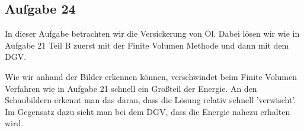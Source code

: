\newpage
\subsection{Aufgabe 24}
In dieser Aufgabe betrachten wir die Versickerung von Öl. Dabei lösen wir wie in Aufgabe 21 Teil B zuerst mit der Finite Volumen Methode und dann mit dem DGV.
\begin{figure}[H]
	\centering
\end{figure}
Wie wir anhand der Bilder erkennen können, verschwindet beim Finite Volumen Verfahren wie in Aufgabe 21 schnell ein Großteil der Energie. An den Schaubildern erkennt man das daran, dass die Lösung relativ schnell 'verwischt'. Im Gegensatz dazu sieht man bei dem DGV, dass die Energie nahezu erhalten wird.

